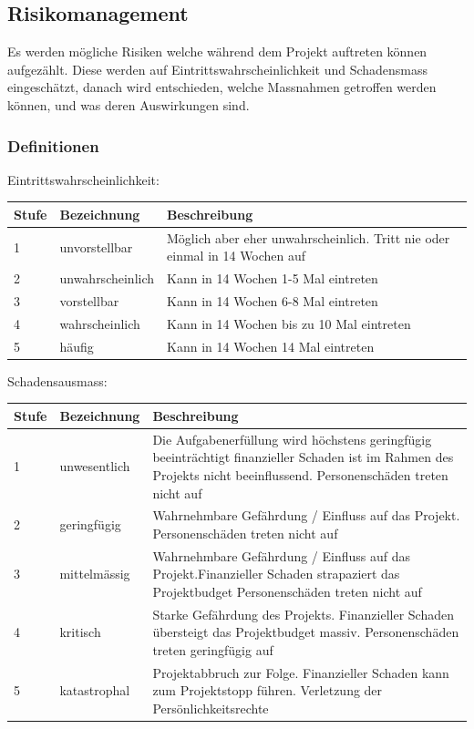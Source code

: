 \documentclass[a4paper]{scrreprt}
\begin{document}
\subsection{Risikomanagement}

Es werden mögliche Risiken welche während dem Projekt auftreten können aufgezählt. Diese werden auf Eintrittswahrscheinlichkeit und Schadensmass eingeschätzt, danach wird entschieden, welche Massnahmen getroffen werden können, und was deren Auswirkungen sind.

\subsubsection{Definitionen}
\label{sssec:Def}
\vspace{1em}
\noindent
Eintrittswahrscheinlichkeit:

\vspace{1em}
\noindent
\begin{tabular}{|p{}|p{}|p{}|}
	\hline
	\textbf{Stufe} & \textbf{Bezeichnung} & \textbf{Beschreibung} \\
	\hline
	1 & unvorstellbar & Möglich aber eher unwahrscheinlich. Tritt nie oder einmal in 14 Wochen auf \\
	\hline
	2 & unwahrscheinlich & Kann in 14 Wochen 1-5 Mal eintreten\\
	\hline
	3 & vorstellbar & Kann in 14 Wochen 6-8 Mal eintreten \\
	\hline
	4 & wahrscheinlich & Kann in 14 Wochen bis zu 10 Mal eintreten \\
	\hline
	5 & häufig & Kann in 14 Wochen 14 Mal eintreten\\
	\hline
\end{tabular}

\vspace{1em}
\noindent
Schadensausmass:

\vspace{1em}
\noindent
\begin{tabular}{|p{}|p{}|p{}|}
	\hline
	\textbf{Stufe} & \textbf{Bezeichnung} & \textbf{Beschreibung} \\
	\hline
	1 & unwesentlich & Die Aufgabenerfüllung wird höchstens geringfügig beeinträchtigt finanzieller Schaden ist im Rahmen des Projekts nicht beeinflussend. Personenschäden treten nicht auf \\
	\hline
	2 & geringfügig & Wahrnehmbare Gefährdung / Einfluss auf das Projekt. Personenschäden treten nicht auf \\
	\hline
	3 & mittelmässig & Wahrnehmbare Gefährdung / Einfluss auf das Projekt.Finanzieller Schaden strapaziert das Projektbudget
	Personenschäden treten nicht auf \\
	\hline
	4 & kritisch & Starke Gefährdung des Projekts. Finanzieller Schaden übersteigt das Projektbudget massiv. Personenschäden treten geringfügig auf \\
	\hline
	5 & katastrophal & Projektabbruch zur Folge. Finanzieller Schaden kann zum Projektstopp führen. Verletzung der Persönlichkeitsrechte
	\\
	\hline
\end{tabular}
\end{document}
